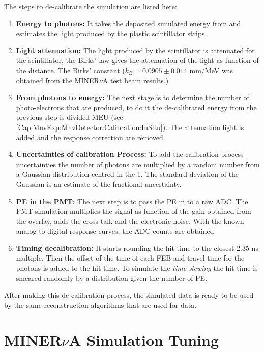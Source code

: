 The steps to de-calibrate the simulation are listed here: 
\begin{enumerate}
    \item \textbf{Energy to photons:} It takes the deposited simulated energy from and estimates the light produced by the plastic scintillator strips.  
    \item \textbf{Light attenuation:} The light produced by the scintillator is attenuated for the scintillator, the Birks' law \cite{PhysRevD.98.030001} gives the attenuation of the light as function of the distance. The Birks' constant ($k_B =  0.0905 \pm 0.014 $ mm/MeV was obtained from the MINER$\nu$A test beam results\cite{minervacollaboration2015minerva}.)
    \item \textbf{From photons to energy:} The next stage is to determine the number of photo-electrons that are produced, to do it the de-calibrated energy from the previous step is divided MEU (see \ref{Cap:MnvExp:MnvDetector:Calibration:InSitu}). The attenuation light is added and the response correction are removed. 
    \item \textbf{Uncertainties of calibration Process:} To add the calibration process uncertainties the number of photons are multiplied by a random number from a Gaussian distribution centred in the 1. The standard deviation of the Gaussian is an estimate of the fractional uncertainty. 
    \item \textbf{PE in the PMT:} The next step is to pass the PE in to a raw ADC. The PMT simulation multiplies the signal as function of the gain obtained from the overlay, adds the cross talk and the electronic noise. With the known analog-to-digital response curves, the ADC counts are obtained. 
    \item \textbf{Timing decalibration:} It starts rounding the hit time to the closest 2.35 ns multiple. Then the offset of the time of each FEB and travel time for the photons is added to the hit time. To simulate the \textit{time-slewing} the hit time is smeared randomly by a distribution given the number of PE. 
\end{enumerate}

After making this de-calibration process, the simulated data is ready to be used by the same reconstruction algorithms that are used for data. 


\section{MINER$\nu$A Simulation Tuning}
\label{Cap:Simulation:MnvGENIETunes}

